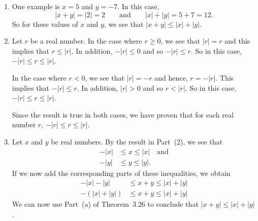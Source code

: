 \documentclass[11pt]{article}
\begin{document}
\begin{enumerate}
\item One example is $x = 5$ and $y = -7$.  In this case, 
\[
\left| x + y \right| = \left| 2 \right| = 2 \qquad \text{and} \qquad \left| x \right| + \left| y \right| = 5 + 7 = 12.
\]
So for these values of $x$ and $y$, we see that 
$\left| x + y \right| \leq \left| x \right| + \left| y \right|$.

\item Let $r$ be a real number. In the case where $r \geq 0$, we see that $\left| r \right| = r$ and this implies that $r \leq \left| r \right|$. In addition, $-\left| r \right| \leq 0$ and so 
$-\left| r \right| \leq r$.  So in this case, $-\left| r \right| \leq r \leq \left| r \right|$.

In the case where $r < 0$, we see that $\left| r \right| = -r$ and hence, 
$r = -\left| r \right|$.  This implies that 
$-\left| r \right| \leq r$. In addition, $\left| r \right| > 0$ and so 
$r < \left| r \right|$.  So in this case, $-\left| r \right| \leq r \leq \left| r \right|$.

Since the result is true in both cases, we have proven that for each real number $r$, 
$-\left| r \right| \leq r \leq \left| r \right|$.

\item Let $x$ and $y$ be real numbers.  By the result in Part~(2), we see that
\begin{align*}
-\left| x \right| &\leq x \leq \left| x \right| \quad \text{and} \\
-\left| y \right| &\leq y \leq \left| y \right|.
\end{align*}
If we now add the corresponding parts of these inequalities, we obtain
\begin{align*}
-\left| x \right| - \left| y \right| &\leq x + y \leq \left| x \right| + \left| y \right| \\
-\left( \left| x \right| + \left| y \right| \right) &\leq x + y \leq \left| x \right| + \left| y \right|
\end{align*}
We can now use Part~(a) of Theorem~3.26 to conclude that 
$\left| x + y \right| \leq \left| x \right| + \left| y \right|$.
\end{enumerate}
\end{document}
